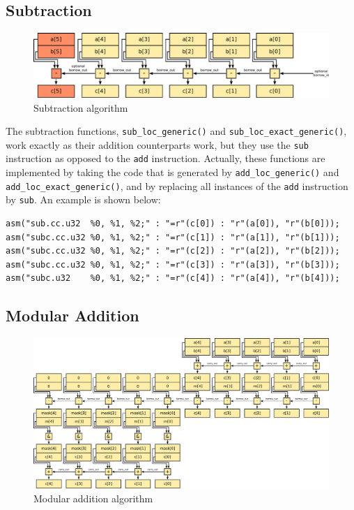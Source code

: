 \documentclass[12pt, a4paper]{report}
\begin{document}
\subsection{Subtraction}
\begin{figure}[h]
\centering
\includegraphics[width=\linewidth]{figs/subtraction}
\caption{Subtraction algorithm}
\label{fig:subtraction}
\end{figure}

The subtraction functions, \verb+sub_loc_generic()+ and
\verb+sub_loc_exact_generic()+, work exactly as their addition counterparts
work, but they use the \verb+sub+ instruction as opposed to the \verb+add+
instruction.
Actually, these functions are implemented by taking the code that is generated
by \verb+add_loc_generic()+ and \verb+add_loc_exact_generic()+, and by replacing
all instances of the \verb+add+ instruction by \verb+sub+.
An example is shown below:

\begin{lstlisting}
asm("sub.cc.u32  %0, %1, %2;" : "=r"(c[0]) : "r"(a[0]), "r"(b[0]));
asm("subc.cc.u32 %0, %1, %2;" : "=r"(c[1]) : "r"(a[1]), "r"(b[1]));
asm("subc.cc.u32 %0, %1, %2;" : "=r"(c[2]) : "r"(a[2]), "r"(b[2]));
asm("subc.cc.u32 %0, %1, %2;" : "=r"(c[3]) : "r"(a[3]), "r"(b[3]));
asm("subc.u32    %0, %1, %2;" : "=r"(c[4]) : "r"(a[4]), "r"(b[4]));
\end{lstlisting}

\subsection{Modular Addition}
\begin{figure}[h]
\centering
\includegraphics[width=\linewidth]{figs/modular_addition}
\caption{Modular addition algorithm}
\label{fig:modular_addition}
\end{figure}
\end{document}

